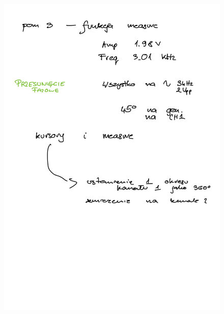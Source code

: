 \documentclass[14pt, table]{extarticle}
\begin{document}
\begin{figure}[H]
\includegraphics[scale=0.23]{B1}
\centering
\end{figure}
\end{document}
